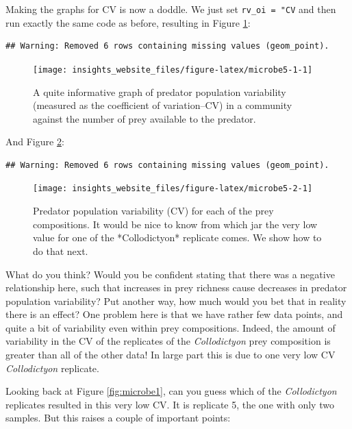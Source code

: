 \documentclass[]{book}
\begin{document}
Making the graphs for CV is now a doddle. We just set \texttt{rv\_oi\ =\ "CV} and then run exactly the same code as before, resulting in Figure \ref{fig:microbe5-1}:

\begin{verbatim}
## Warning: Removed 6 rows containing missing values (geom_point).
\end{verbatim}

\begin{figure}

{\centering \texttt{[image: insights\_website\_files/figure-latex/microbe5-1-1]} 

}

\caption{A quite informative graph of predator population variability (measured as the coefficient of variation--CV) in a community against the number of prey available to the predator.}\label{fig:microbe5-1}
\end{figure}

And Figure \ref{fig:microbe5-2}:

\begin{verbatim}
## Warning: Removed 6 rows containing missing values (geom_point).
\end{verbatim}

\begin{figure}

{\centering \texttt{[image: insights\_website\_files/figure-latex/microbe5-2-1]} 

}

\caption{Predator population variability (CV) for each of the prey compositions. It would be nice to know from which jar the very low value for one of the *Collodictyon* replicate comes. We show how to do that next.}\label{fig:microbe5-2}
\end{figure}

What do you think? Would you be confident stating that there was a negative relationship here, such that increases in prey richness cause decreases in predator population variability? Put another way, how much would you bet that in reality there is an effect? One problem here is that we have rather few data points, and quite a bit of variability even within prey compositions. Indeed, the amount of variability in the CV of the replicates of the \emph{Collodictyon} prey composition is greater than all of the other data! In large part this is due to one very low CV \emph{Collodictyon} replicate.

Looking back at Figure \ref{fig:microbe1}, can you guess which of the \emph{Collodictyon} replicates resulted in this very low CV. It is replicate 5, the one with only two samples. But this raises a couple of important points:
\end{document}
